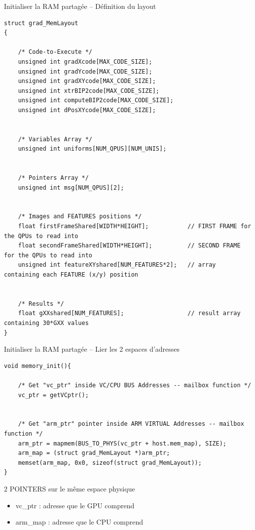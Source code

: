\documentclass{bredelebeamer}
\begin{document}
\begin{frame}[fragile]{Initialiser la RAM partagée -- Définition du layout}

\begin{lstlisting}
struct grad_MemLayout
{

    /* Code-to-Execute */
    unsigned int gradXcode[MAX_CODE_SIZE];
    unsigned int gradYcode[MAX_CODE_SIZE];
    unsigned int gradXYcode[MAX_CODE_SIZE];
    unsigned int xtrBIP2code[MAX_CODE_SIZE];
    unsigned int computeBIP2code[MAX_CODE_SIZE];
    unsigned int dPosXYcode[MAX_CODE_SIZE];


    /* Variables Array */
    unsigned int uniforms[NUM_QPUS][NUM_UNIS];


    /* Pointers Array */
    unsigned int msg[NUM_QPUS][2];


    /* Images and FEATURES positions */
    float firstFrameShared[WIDTH*HEIGHT];           // FIRST FRAME for the QPUs to read into
    float secondFrameShared[WIDTH*HEIGHT];          // SECOND FRAME for the QPUs to read into
    unsigned int featureXYshared[NUM_FEATURES*2];   // array containing each FEATURE (x/y) position


    /* Results */
    float gXXshared[NUM_FEATURES];                  // result array containing 30*GXX values
}
\end{lstlisting}

\end{frame}


\begin{frame}[fragile]{Initialiser la RAM partagée -- Lier les 2 espaces d'adresses}

\begin{lstlisting}
void memory_init(){

    /* Get "vc_ptr" inside VC/CPU BUS Addresses -- mailbox function */
    vc_ptr = getVCptr();


    /* Get "arm_ptr" pointer inside ARM VIRTUAL Addresses -- mailbox function */
    arm_ptr = mapmem(BUS_TO_PHYS(vc_ptr + host.mem_map), SIZE);
    arm_map = (struct grad_MemLayout *)arm_ptr;
    memset(arm_map, 0x0, sizeof(struct grad_MemLayout));
}
\end{lstlisting}

\begin{alertblock}{2 POINTERS sur le m\^eme espace physique}
\begin{itemize}
\item vc\_ptr : adresse que le GPU comprend
\item arm\_map : adresse que le CPU comprend
\end{itemize}
\end{alertblock}

\end{frame}
\end{document}

